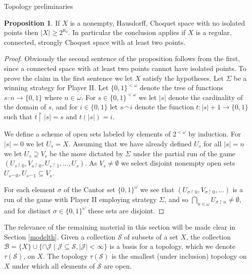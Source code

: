 \documentclass{amsart}
\theoremstyle{definition}\newtheorem{theorem}{Theorem}
\theoremstyle{definition}\newtheorem{bigtheorem}{Theorem}
\numberwithin{theorem}{section}
\theoremstyle{definition}\newtheorem{corollary}[theorem]{Corollary}
\theoremstyle{definition}\newtheorem{proposition}[theorem]{Proposition}
\theoremstyle{definition}\newtheorem{definition}[theorem]{Definition}
\theoremstyle{definition}\newtheorem{question}[theorem]{Question}
\theoremstyle{definition}\newtheorem{example}[theorem]{Example}
\theoremstyle{definition}\newtheorem{remark}[theorem]{Remark}
\theoremstyle{definition}\newtheorem{note}[theorem]{Note}
\theoremstyle{definition}\newtheorem{lemma}[theorem]{Lemma}
\theoremstyle{definition}\newtheorem{fact}[theorem]{Fact}
\theoremstyle{definition}\newtheorem{define}[theorem]{Definition}
\theoremstyle{definition}\newtheorem{definitions}[theorem]{Definitions}
\theoremstyle{definition}\newtheorem{claim}[theorem]{Claim}
\theoremstyle{definition}\newtheorem{obs}[theorem]{Observation}
\theoremstyle{definition}\newtheorem{construction}[theorem]{Construction}
\begin{document}
\begin{section}{Topology preliminaries}
\begin{proposition}\label{cardinalityChoquet}  If $X$ is a nonempty, Hausdorff, Choquet space with no isolated points then $|X| \geq 2^{\aleph_0}$.  In particular the conclusion applies if $X$ is a regular, connected, strongly Choquet space with at least two points.
\end{proposition}

\begin{proof}  Obviously the second sentence of the proposition follows from the first, since a connected space with at least two points cannot have isolated points.  To prove the claim in the first sentence we let $X$ satisfy the hypotheses.  Let $\Sigma$ be a winning strategy for Player II.  Let $\{0, 1\}^{<\omega}$ denote the tree of functions $s: n \rightarrow \{0, 1\}$ where $n\in \omega$.  For $s \in \{0, 1\}^{<\omega}$ we let $|s|$ denote the cardinality of the domain of $s$, and for $i\in \{0, 1\}$ let $s\smallfrown i$ denote the function $t: |s|+ 1 \rightarrow \{0, 1\}$ such that $t\upharpoonright |s| = s$ and $t(|s|) = i$.

We define a scheme of open sets labeled by elements of $2^{< \omega}$ by induction.  For $|s| = 0$ we let $U_s = X$.  Assuming that we have already defined $U_s$ for all $|s| = n$ we let $U_s \supseteq V_s$ be the move dictated by $\Sigma$ under the partial run of the game $(U_{s\upharpoonright 0}, V_{s\upharpoonright 0}, U_{s\upharpoonright 1}, \ldots, U_s)$.  As $V_s \neq \emptyset$ we select disjoint nonempty open sets $U_{s \smallfrown 0}, U_{s\smallfrown 1} \subseteq V_s$.

For each element $\sigma$ of the Cantor set $\{0, 1\}^{\omega}$ we see that $(U_{\sigma\upharpoonright 0}, V_{\sigma \upharpoonright 0}, \ldots)$ is a run of the game with Player II employing strategy $\Sigma$, and so $\bigcap_{n\in \omega} U_{\sigma \upharpoonright n} \neq \emptyset$, and for distinct $\sigma \in \{0, 1\}^{\omega}$ these sets are disjoint.
\end{proof}

The relevance of the remaining material in this section will be made clear in Section \ref{modelth}.  Given a collection $\mathcal{S}$ of subsets of a set $X$, the collection $\mathcal{B} = \{X\} \cup \{\cap \mathcal{J} \mid \mathcal{J} \subseteq \mathcal{S}, |\mathcal{J}|<\infty\}$ is a basis for a topology, which we denote $\tau(\mathcal{S})$, on $X$.  The topology $\tau(\mathcal{S})$ is the smallest (under inclusion) topology on $X$ under which all elements of $\mathcal{S}$ are open.


\end{section}
\end{document}
